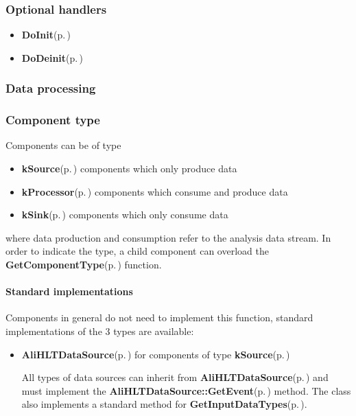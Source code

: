 \subsubsection{Optional handlers}\label{classAliHLTComponent_alihltcomponent-opt-mehods}
\begin{itemize}
\item {\bf Do\-Init}{\rm (p.\,\pageref{classAliHLTComponent_b5})}\item {\bf Do\-Deinit}{\rm (p.\,\pageref{classAliHLTComponent_b6})}\end{itemize}
\subsubsection{Data processing}\label{classAliHLTComponent_alihltcomponent-processing-mehods}
\subsubsection{Component type}\label{classAliHLTComponent_alihltcomponent-type}
Components can be of type\begin{itemize}
\item {\bf k\-Source}{\rm (p.\,\pageref{classAliHLTComponent_w9w1})} components which only produce data\item {\bf k\-Processor}{\rm (p.\,\pageref{classAliHLTComponent_w9w2})} components which consume and produce data\item {\bf k\-Sink}{\rm (p.\,\pageref{classAliHLTComponent_w9w3})} components which only consume data\end{itemize}


where data production and consumption refer to the analysis data stream. In order to indicate the type, a child component can overload the {\bf Get\-Component\-Type}{\rm (p.\,\pageref{classAliHLTComponent_a8})} function. \paragraph{Standard implementations}\label{classAliHLTComponent_alihltcomponent-type-std}
Components in general do not need to implement this function, standard implementations of the 3 types are available:\begin{itemize}
\item {\bf Ali\-HLTData\-Source}{\rm (p.\,\pageref{classAliHLTDataSource})} for components of type {\bf k\-Source}{\rm (p.\,\pageref{classAliHLTComponent_w9w1})} \par
 All types of data sources can inherit from {\bf Ali\-HLTData\-Source}{\rm (p.\,\pageref{classAliHLTDataSource})} and must implement the {\bf Ali\-HLTData\-Source::Get\-Event}{\rm (p.\,\pageref{classAliHLTDataSource_d0})} method. The class also implements a standard method for {\bf Get\-Input\-Data\-Types}{\rm (p.\,\pageref{classAliHLTComponent_a10})}.\end{itemize}


